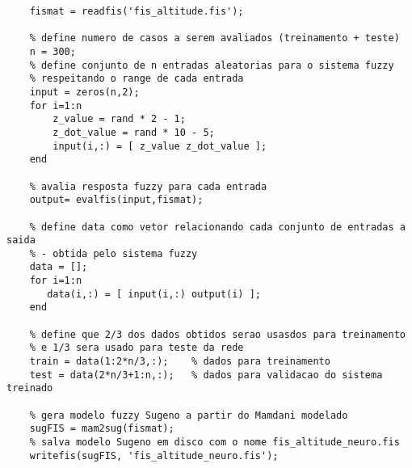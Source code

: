 \begin{lstlisting}[inputencoding=latin1]
	% le arquivo fis referente ao controle de altitude
	fismat = readfis('fis_altitude.fis');
	
	% define numero de casos a serem avaliados (treinamento + teste)
	n = 300;
	% define conjunto de n entradas aleatorias para o sistema fuzzy
	% respeitando o range de cada entrada
	input = zeros(n,2);
	for i=1:n    
	    z_value = rand * 2 - 1;
	    z_dot_value = rand * 10 - 5;
	    input(i,:) = [ z_value z_dot_value ];
	end
	
	% avalia resposta fuzzy para cada entrada
	output= evalfis(input,fismat);
	
	% define data como vetor relacionando cada conjunto de entradas a saida
	% - obtida pelo sistema fuzzy
	data = [];
	for i=1:n
	   data(i,:) = [ input(i,:) output(i) ];
	end
	
	% define que 2/3 dos dados obtidos serao usasdos para treinamento
	% e 1/3 sera usado para teste da rede
	train = data(1:2*n/3,:);    % dados para treinamento
	test = data(2*n/3+1:n,:);   % dados para validacao do sistema treinado
	
	% gera modelo fuzzy Sugeno a partir do Mamdani modelado
	sugFIS = mam2sug(fismat);
	% salva modelo Sugeno em disco com o nome fis_altitude_neuro.fis
	writefis(sugFIS, 'fis_altitude_neuro.fis');
\end{lstlisting}
